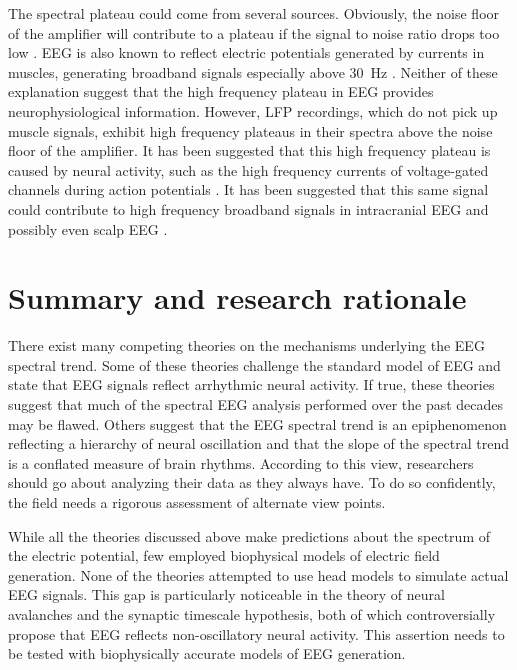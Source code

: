 The spectral plateau could come from several sources. Obviously, the noise floor of the amplifier will contribute to a plateau if the signal to noise ratio drops too low \cite{Scheer2006}. EEG is also known to reflect electric potentials generated by currents in muscles, generating broadband signals especially above \qty{30}{\hertz} \cite{Muthukumaraswamy2013}. Neither of these explanation suggest that the high frequency plateau in EEG provides neurophysiological information. However, LFP recordings, which do not pick up muscle signals, exhibit high frequency plateaus in their spectra above the noise floor of the amplifier. It has been suggested that this high frequency plateau is caused by neural activity, such as the high frequency currents of voltage-gated channels during action potentials \cite{Ray2008, Ray2011, Gao2016, Zanos2010}. It has been suggested that this same signal could contribute to high frequency broadband signals in intracranial EEG and possibly even scalp EEG \cite{Ray2008}.

\section{Summary and research rationale}

There exist many competing theories on the mechanisms underlying the EEG spectral trend. Some of these theories challenge the standard model of EEG and state that EEG signals reflect arrhythmic neural activity. If true, these theories suggest that much of the spectral EEG analysis performed over the past decades may be flawed. Others suggest that the EEG spectral trend is an epiphenomenon reflecting a hierarchy of neural oscillation and that the slope of the spectral trend is a conflated measure of brain rhythms. According to this view, researchers should go about analyzing their data as they always have. To do so confidently, the field needs a rigorous assessment of alternate view points.

While all the theories discussed above make predictions about the spectrum of the electric potential, few employed biophysical models of electric field generation. None of the theories attempted to use head models to simulate actual EEG signals. This gap is particularly noticeable in the theory of neural avalanches and the synaptic timescale hypothesis, both of which controversially propose that EEG reflects non-oscillatory neural activity. This assertion needs to be tested with biophysically accurate models of EEG generation.

